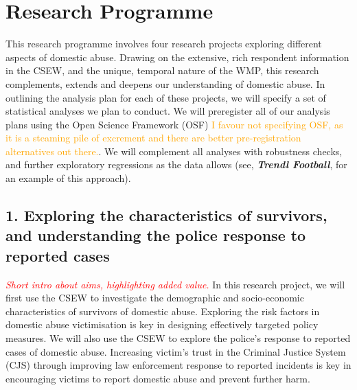 \documentclass[11pt, a4paper]{article}
\newcommand{\TM}[1] {{\textcolor{orange}{#1}}}
\begin{document}
\newpage

\section*{Research Programme}

This research programme involves four research projects exploring different aspects of domestic abuse. Drawing on the extensive, rich respondent information in the CSEW, and the unique, temporal nature of the WMP, this research complements, extends and deepens our understanding of domestic abuse. In outlining the analysis plan for each of these projects, we will specify a set of statistical analyses we plan to conduct. We will preregister all of our analysis plans using the Open Science Framework (OSF) \TM{I favour not specifying OSF, as it is a steaming pile of excrement and there are better pre-registration alternatives out there.}. We will complement all analyses with robustness checks, and further exploratory regressions as the data allows (see, \textbf{\textit{Trendl Football}}, for an example of this approach).

\subsection*{1. Exploring the characteristics of survivors, and understanding the police response to reported cases}

 \textcolor{red}{\textit{Short intro about aims, highlighting added value.}}
In this research project, we will first use the CSEW to investigate the demographic and socio-economic characteristics of survivors of domestic abuse. Exploring the risk factors in domestic abuse victimisation is key in designing effectively targeted policy measures. We will also use the CSEW to explore the police's response to reported cases of domestic abuse. Increasing victim's trust in the Criminal Justice System (CJS) through improving law enforcement response to reported incidents is key in encouraging victims to report domestic abuse and prevent further harm.

\end{document}
